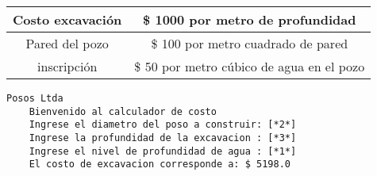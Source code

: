 \begin{enumerate}
    \begin{tabular}{c|c}
      \toprule
      Costo excavación & \$ 1000 por metro de profundidad \\
      \midrule
      Pared del pozo   & \$ 100 por metro cuadrado de pared \\
      \midrule
      inscripción      & \$ 50 por metro cúbico de agua en el pozo \\
    \bottomrule
    \end{tabular}

    \vspace*{\baselineskip}
    
    \begin{lstlisting}[style=consola]    
    Posos Ltda
    Bienvenido al calculador de costo
    Ingrese el diametro del poso a construir: [*2*]
    Ingrese la profundidad de la excavacion : [*3*]
    Ingrese el nivel de profundidad de agua : [*1*]
    El costo de excavacion corresponde a: $ 5198.0
    \end{lstlisting}
  \end{enumerate}